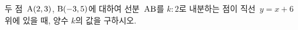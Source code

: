 두 점~$\mathrm{A}(2{,}\mkern3mu\mathopen{}3)$, $\mathrm{B}(-3{,}\mkern3mu\mathopen{}5)$에 대하여 선분~$\mathrm{AB}$를 $k:2$로 내분하는 점이 직선~$y=x+6$ 위에 있을 때, 양수 $k$의 값을 구하시오.
